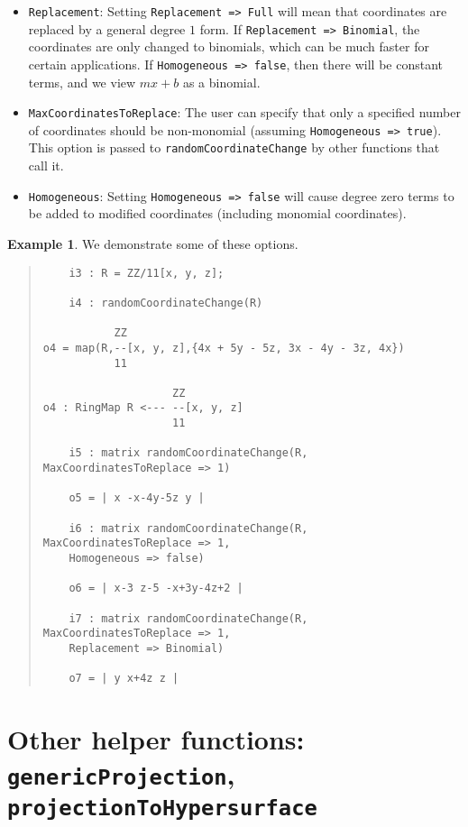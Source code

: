 \documentclass[11pt]{amsart}
\theoremstyle{definition}
\newtheorem{example}{Example}[section]
\begin{document}
\begin{itemize}
\item {\tt Replacement}: Setting {\tt Replacement => Full} will mean that coordinates are replaced by a general degree $1$ form.  If {\tt Replacement => Binomial}, the coordinates are only changed to binomials, which can be much faster for certain applications. If {\tt Homogeneous => false}, then there will be constant terms, and we view $mx + b$ as a binomial.
\item {\tt MaxCoordinatesToReplace}: The user can specify that only a specified number of coordinates should be non-monomial (assuming {\tt Homogeneous => true}).  
  This option is passed to {\tt randomCoordinateChange} by other functions that call it. 		
\item {\tt Homogeneous}:  Setting {\tt Homogeneous => false} will cause degree zero terms to be added to modified coordinates (including monomial coordinates).		
\end{itemize} 
\begin{example}  We demonstrate some of these options.
%
  {{\small\color{blue}
  \begin{quote}
\begin{verbatim}
	i3 : R = ZZ/11[x, y, z];
	
	i4 : randomCoordinateChange(R)
	
           ZZ
o4 = map(R,--[x, y, z],{4x + 5y - 5z, 3x - 4y - 3z, 4x})                     
           11
           
                    ZZ
o4 : RingMap R <--- --[x, y, z]
                    11
                    
	i5 : matrix randomCoordinateChange(R, MaxCoordinatesToReplace => 1)
	
	o5 = | x -x-4y-5z y |
	
	i6 : matrix randomCoordinateChange(R, MaxCoordinatesToReplace => 1, 
	Homogeneous => false)
	
	o6 = | x-3 z-5 -x+3y-4z+2 |
	
	i7 : matrix randomCoordinateChange(R, MaxCoordinatesToReplace => 1, 
	Replacement => Binomial)
	
	o7 = | y x+4z z |
\end{verbatim}
\end{quote}
    }}
  
\end{example}


\section{Other helper functions: {\tt genericProjection}, {\tt projectionToHypersurface}}\label{projectionfunctions}
\end{document}
